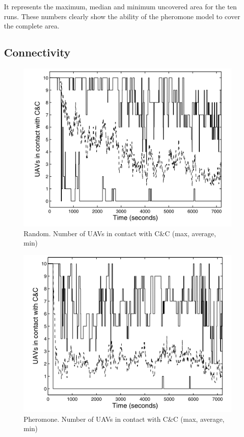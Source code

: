 It represents the maximum, median and minimum uncovered area for the ten runs. These numbers clearly show the ability of the pheromone model to cover the complete area. 

\subsection{Connectivity}

\begin{figure}[!h]
\centering
   \includegraphics{../images/random_resultat_connectivite.png}
\caption{\label{randomconnect} Random. Number of UAVs in contact with C\&C (max, average, min)\cite{UAV}}
\end{figure}

\newpage

\begin{figure}[!h]
\centering
   \includegraphics{../images/pheromone_resultat_connectivite.png}
\caption{\label{pheromoneconnect}Pheromone. Number of UAVs in contact with C\&C (max, average, min)\cite{UAV}}
\end{figure}

